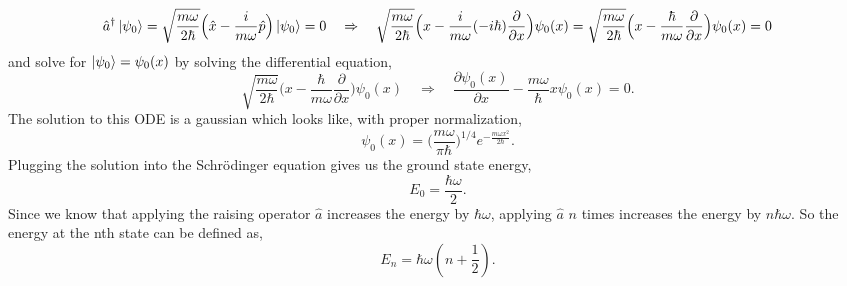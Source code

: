 \documentclass{article}
\newcommand{\be}{\begin{equation}}
\newcommand{\ee}{\end{equation}}
\begin{document}
\be
  \hat{a}^{\dagger} \ket{\psi_0} = \sqrt{\frac{m \omega}{2\hbar}}\Big(\hat{x} - \frac{i}{m \omega} \hat{p} \Big)\ket{\psi_0} = 0 \quad \Rightarrow \quad \sqrt{\frac{m \omega}{2\hbar}}\Big(x - \frac{i}{m \omega} (-i \hbar) \frac{\partial}{\partial x} \Big) \psi_0(x) = \sqrt{\frac{m \omega}{2\hbar}}\Big(x - \frac{\hbar}{m \omega} \frac{\partial}{\partial x} \Big) \psi_0(x) = 0
\ee
and solve for $\ket{\psi_0} = \psi_0(x)$ by solving the differential equation,
\be
  \sqrt{\frac{m \omega}{2\hbar}}\Big(x - \frac{\hbar}{m \omega} \frac{\partial}{\partial x} \Big) \psi_0(x) \quad \Rightarrow \quad \frac{\partial \psi_0(x)}{\partial x} - \frac{m \omega}{\hbar} x \psi_0(x) = 0 .
\ee
The solution to this ODE is a gaussian which looks like, with proper normalization,
\be
  \psi_0(x) = \Big(\frac{m \omega}{\pi \hbar}\Big)^{1/4} e^{-\frac{m \omega x^2}{2 \hbar}} .
\ee
Plugging the solution into the Schr\"odinger equation gives us the ground state energy,
\be
  E_0 = \frac{\hbar \omega}{2} .
\ee
Since we know that applying the raising operator $\hat{a}$ increases the energy by $\hbar \omega$, applying $\hat{a}$ $n$ times increases the energy by $n \hbar \omega$.
So the energy at the nth state can be defined as,
\be
  E_n = \hbar \omega(n + \frac{1}{2}) .
\ee
\end{document}
